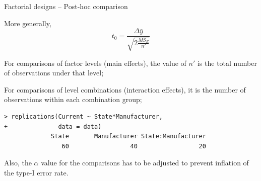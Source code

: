 \begin{frame}[fragile]{Factorial designs -- Post-hoc comparison}

More generally,
\begin{equation*}
t_0 = \frac{\Delta\bar{y}}{\sqrt{2\frac{MS_E}{n'}}}
\end{equation*}

For comparisons of factor levels (main effects), the value of $n'$ is the total number of observations under that level;
\bigskip

For comparisons of level combinations (interaction effects), it is the number of observations within each combination group;

\begin{verbatim}
> replications(Current ~ State*Manufacturer,
+              data = data)
             State       Manufacturer State:Manufacturer
                60                 40                 20
\end{verbatim}

Also, the $\alpha$ value for the comparisons has to be adjusted to prevent inflation of the type-I error rate.
\end{frame}






















%

